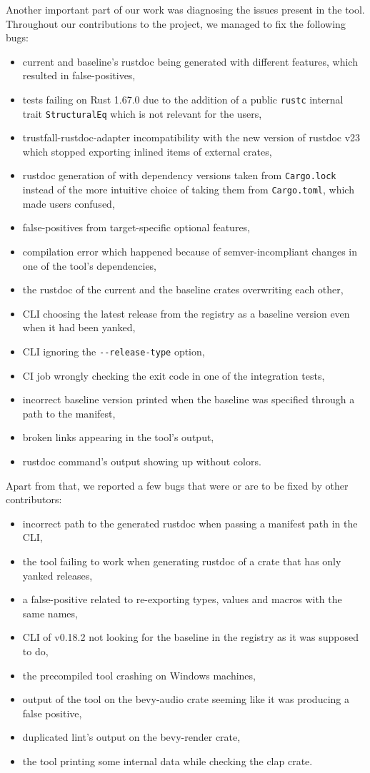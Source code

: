 \documentclass[licencjacka,en]{pracamgr}
\begin{document}
Another important part of our work was diagnosing the issues present in the tool.
Throughout our contributions to the project, we managed to fix the following bugs:
\begin{itemize}
	\item current and baseline's rustdoc being generated with different features, which
		resulted in false-positives,
	\item tests failing on Rust 1.67.0 due to the addition of a public \texttt{rustc}
		internal trait \texttt{StructuralEq} which is not relevant for the users,
	\item trustfall-rustdoc-adapter incompatibility with the new version of rustdoc v23
		which stopped exporting inlined items of external crates,
	\item rustdoc generation of  with dependency versions taken from
		\texttt{Cargo.lock} instead of the more intuitive choice of taking them
		from \texttt{Cargo.toml}, which made users confused,
	\item false-positives from target-specific optional features,
	\item compilation error which happened because of semver-incompliant changes
		in one of the tool's dependencies,
	\item the rustdoc of the current and the baseline crates overwriting each other,
	\item CLI choosing the latest release from the registry as a baseline version
		even when it had been yanked,
	\item CLI ignoring the \texttt{-{}-release-type} option,
	\item CI job wrongly checking the exit code in one of
		the integration tests,
	\item incorrect baseline version printed when the baseline was specified through
		a path to the manifest,
	\item broken links appearing in the tool's output,
	\item rustdoc command's output showing up without colors.
\end{itemize}
Apart from that, we reported a few bugs that were or are to be fixed by other contributors:
\begin{itemize}
	\item incorrect path to the generated rustdoc when passing a
		manifest path in the CLI,
	\item the tool failing to work when generating rustdoc of a crate
		that has only yanked releases,
	\item a false-positive related to re-exporting types, values and
		macros with the same names,
	\item CLI of v0.18.2 not looking for the baseline in the registry
		as it was supposed to do,
	\item the precompiled tool crashing on Windows machines,
	\item output of the tool on the bevy-audio crate seeming
		like it was producing a false positive,
	\item duplicated lint's output on the bevy-render crate,
	\item the tool printing some internal data while checking the clap
		crate.
\end{itemize}
\end{document}
